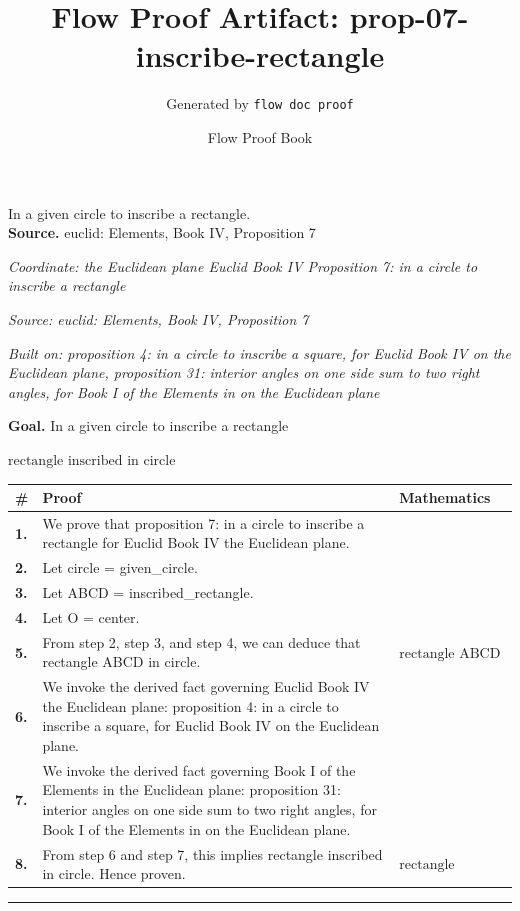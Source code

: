 \documentclass[11pt]{article}
\title{Flow Proof Artifact: prop-07-inscribe-rectangle}
\author{Generated by \texttt{flow doc proof}}
\date{Flow Proof Book}
\theoremstyle{definition}
\begin{document}
\maketitle
In a given circle to inscribe a rectangle.\\[0.5em]
\textbf{Source.} euclid: Elements, Book IV, Proposition 7\\[0.5em]
\bigskip
{}\par
\smallskip\noindent\textit{Coordinate: the Euclidean plane \cdot Euclid Book IV \cdot Proposition 7: in a circle to inscribe a rectangle}\par
\smallskip\noindent\textit{Source: euclid: Elements, Book IV, Proposition 7}\par
\smallskip\noindent\textit{Built on: proposition 4: in a circle to inscribe a square, for Euclid Book IV on the Euclidean plane, proposition 31: interior angles on one side sum to two right angles, for Book I of the Elements in on the Euclidean plane}\par
\medskip
\noindent\textbf{Goal.} In a given circle to inscribe a rectangle\par
\noindent$\displaystyle \text{rectangle inscribed in circle}$\par
\medskip
\noindent
\begin{tabular}{@{} >{\raggedright\arraybackslash}p{} >{\raggedright\arraybackslash}p{} >{\raggedleft\arraybackslash}p{} @{}}
\textbf{\#} & \textbf{Proof} & \textbf{Mathematics} \\
\midrule
\textbf{1.} & We prove that proposition 7: in a circle to inscribe a rectangle for Euclid Book IV the Euclidean plane. & \\[0.45em]
\textbf{2.} & Let circle = given\_circle. & \\[0.45em]
\textbf{3.} & Let ABCD = inscribed\_rectangle. & \\[0.45em]
\textbf{4.} & Let O = center. & \\[0.45em]
\textbf{5.} & From step 2, step 3, and step 4, we can deduce that rectangle ABCD in circle. & $\displaystyle \text{rectangle ABCD in circle}$ \\[0.45em]
\textbf{6.} & We invoke the derived fact governing Euclid Book IV the Euclidean plane: proposition 4: in a circle to inscribe a square, for Euclid Book IV on the Euclidean plane. & \\[0.45em]
\textbf{7.} & We invoke the derived fact governing Book I of the Elements in the Euclidean plane: proposition 31: interior angles on one side sum to two right angles, for Book I of the Elements in on the Euclidean plane. & \\[0.45em]
\textbf{8.} & From step 6 and step 7, this implies rectangle inscribed in circle. Hence proven. & $\displaystyle \text{rectangle inscribed in circle}$ \\[0.45em]
\bottomrule
\end{tabular}
\label{thm:Geometry-Euclid Book IV-proposition_7_in_a_circle_to_inscribe_a_rectangle}
\par\medskip\hrule
\end{document}
